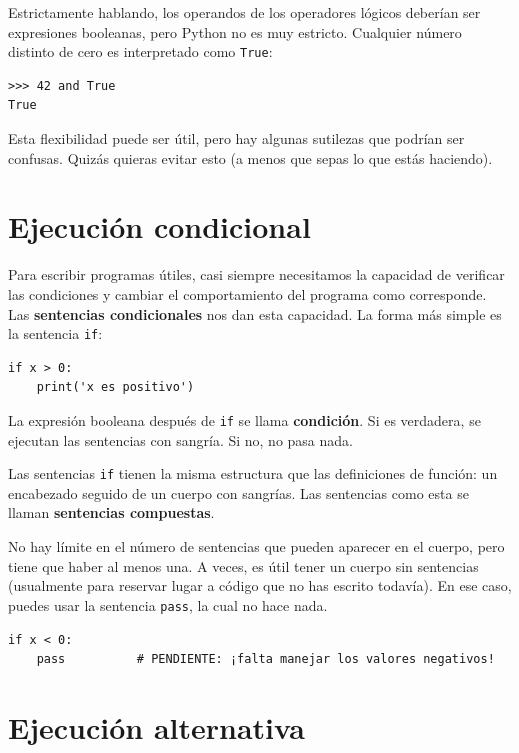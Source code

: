 \documentclass[10pt]{book}
\begin{document}
Estrictamente hablando, los operandos de los operadores lógicos deberían ser
expresiones booleanas, pero Python no es muy estricto.
Cualquier número distinto de cero es interpretado como {\tt True}:

\begin{verbatim}
>>> 42 and True
True
\end{verbatim}
%
Esta flexibilidad puede ser útil, pero hay algunas sutilezas
que podrían ser confusas.  Quizás quieras evitar esto (a menos que
sepas lo que estás haciendo).


\section{Ejecución condicional}
\label{conditional.execution}

Para escribir programas útiles, casi siempre necesitamos la capacidad
de verificar las condiciones y cambiar el comportamiento del programa
como corresponde.  Las {\bf sentencias condicionales} nos dan esta capacidad.  La
forma más simple es la sentencia {\tt if}:

\begin{verbatim}
if x > 0:
    print('x es positivo')
\end{verbatim}
%
La expresión booleana después de {\tt if} se
llama {\bf condición}.  Si es verdadera, se ejecutan las sentencias
con sangría.  Si no, no pasa nada.

Las sentencias {\tt if} tienen la misma estructura que las definiciones de función:
un encabezado seguido de un cuerpo con sangrías.  Las sentencias como esta se
llaman {\bf sentencias compuestas}.

No hay límite en el número de sentencias que pueden aparecer en
el cuerpo, pero tiene que haber al menos una.
A veces, es útil tener un cuerpo sin sentencias (usualmente
para reservar lugar a código que no has escrito todavía).  En ese
caso, puedes usar la sentencia {\tt pass}, la cual no hace nada.

\begin{verbatim}
if x < 0:
    pass          # PENDIENTE: ¡falta manejar los valores negativos!
\end{verbatim}
%

\section{Ejecución alternativa}
\label{alternative.execution}
\end{document}
